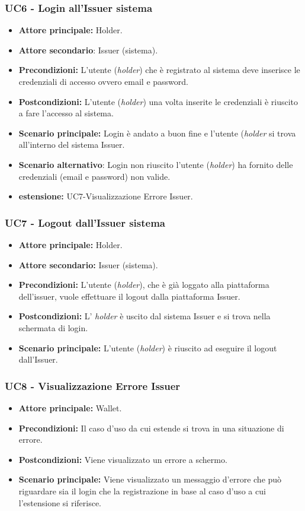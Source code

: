 \subsubsection{UC6 - Login all'Issuer sistema}
\begin{itemize}
\item \textbf{Attore principale:} Holder.
\item \textbf{Attore secondario}: Issuer (sistema). 
\item \textbf{Precondizioni:} L'utente (\textit{holder}) che è registrato al sistema deve inserisce le credenziali di accesso ovvero email e password.
\item \textbf{Postcondizioni:} L'utente (\textit{holder}) una volta inserite le credenziali è riuscito a fare l'accesso al sistema.
\item \textbf{Scenario principale:} Login è andato a buon fine e l'utente  (\textit{holder} si trova all'interno del sistema Issuer.
\item \textbf{Scenario alternativo}: Login non riuscito l'utente (\textit{holder}) ha fornito delle credenziali (email e password) non valide.
\item \textbf{estensione:} UC7-Visualizzazione Errore Issuer.
\end{itemize}

\subsubsection{UC7 - Logout dall'Issuer sistema}
\begin{itemize}
\item \textbf{Attore principale:} Holder.
\item \textbf{Attore secondario:} Issuer (sistema).
\item \textbf{Precondizioni:} L'utente (\textit{holder}), che è già loggato alla piattaforma dell'issuer,  vuole effettuare il logout dalla piattaforma Issuer.
\item \textbf{Postcondizioni:} L' \textit{holder} è uscito dal sistema Issuer e si trova nella schermata di login.
\item \textbf{Scenario principale:} L'utente (\textit{holder}) è riuscito ad eseguire il logout dall'Issuer. 
\end{itemize}

\subsubsection{UC8 - Visualizzazione Errore Issuer}
\begin{itemize}
\item \textbf{Attore principale:} Wallet.
\item \textbf{Precondizioni:} Il caso d'uso da cui estende si trova in una situazione di errore.
\item \textbf{Postcondizioni:} Viene visualizzato un errore a schermo. 
\item \textbf{Scenario principale:} Viene visualizzato un messaggio d’errore che può riguardare sia il login che la registrazione in base al caso d’uso a cui l’estensione si riferisce.
\end{itemize}


